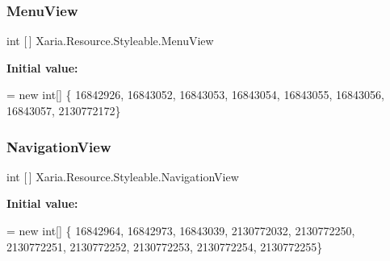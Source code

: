 \subsubsection{\texorpdfstring{Menu\+View}{MenuView}}
{\footnotesize\ttfamily int \mbox{[}$\,$\mbox{]} Xaria.\+Resource.\+Styleable.\+Menu\+View\hspace{0.3cm}{\ttfamily [static]}}

{\bfseries Initial value\+:}
\begin{DoxyCode}
= \textcolor{keyword}{new} \textcolor{keywordtype}{int}[] \{
                    16842926,
                    16843052,
                    16843053,
                    16843054,
                    16843055,
                    16843056,
                    16843057,
                    2130772172\}
\end{DoxyCode}
\mbox{\label{classXaria_1_1Resource_1_1Styleable_a3b08a137f1c0cc6397e6d7e084e875c5}} 
\subsubsection{\texorpdfstring{Navigation\+View}{NavigationView}}
{\footnotesize\ttfamily int \mbox{[}$\,$\mbox{]} Xaria.\+Resource.\+Styleable.\+Navigation\+View\hspace{0.3cm}{\ttfamily [static]}}

{\bfseries Initial value\+:}
\begin{DoxyCode}
= \textcolor{keyword}{new} \textcolor{keywordtype}{int}[] \{
                    16842964,
                    16842973,
                    16843039,
                    2130772032,
                    2130772250,
                    2130772251,
                    2130772252,
                    2130772253,
                    2130772254,
                    2130772255\}
\end{DoxyCode}
\mbox{\label{classXaria_1_1Resource_1_1Styleable_a7277bf35193d1a34c8f9ec8640c913ee}} 
